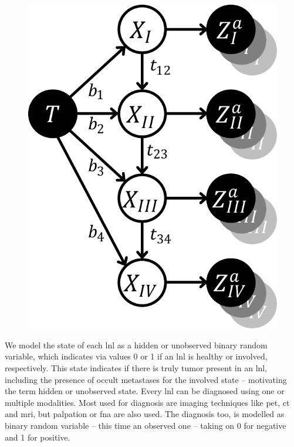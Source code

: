 \documentclass[../ms.tex]{subfiles}
\begin{document}
\begin{figure}
    \centering
    \includegraphics{figures/BN.pdf}
\end{figure}

We model the state of each \gls{lnl} as a hidden or unobserved binary random variable, which indicates via values 0 or 1 if an \gls{lnl} is healthy or involved, respectively. This state indicates if there is truly tumor present in an \gls{lnl}, including the presence of occult metastases for the involved state – motivating the term hidden or unobserved state. Every \gls{lnl} can be diagnosed using one or multiple modalities. Most used for diagnosis are imaging techniques like \gls{pet}, \gls{ct} and \gls{mri}, but palpation or \gls{fna} are also used. The diagnosis too, is modelled as binary random variable – this time an observed one – taking on 0 for negative and 1 for positive.
\end{document}
